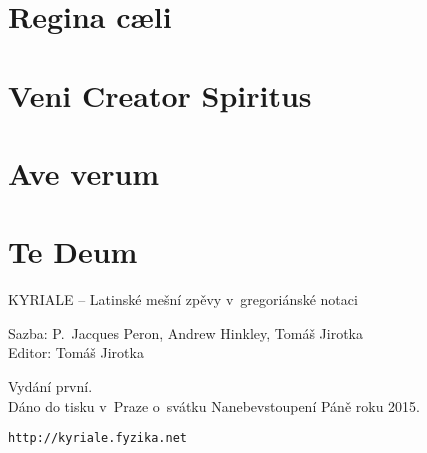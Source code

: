 \documentclass[12pt]{article} %
\begin{document}
\section{Regina c\ae{}li}
\vspace{1em}



\section{Veni Creator Spiritus}
\vspace{0.5em}



\section{Ave verum}


\section{Te Deum}
\vspace{1em}





\newpage
\tableofcontents





\newpage
\thispagestyle{empty}
\mbox{}

\begin{centering}
\setlength{\parskip}{1em}
\vspace{16cm}

	KYRIALE -- Latinské mešní zpěvy v~gregoriánské notaci

	Sazba: P.~Jacques Peron, Andrew Hinkley, Tomáš Jirotka\\
	Editor: Tomáš Jirotka

	Vydání první.\\
	Dáno do tisku v~Praze o~svátku Nanebevstoupení Páně roku 2015.

	{\tt http://kyriale.fyzika.net}

\end{centering}
\end{document}
